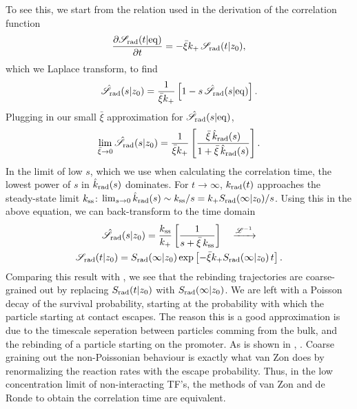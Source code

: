 To see this, we start from the relation used in the derivation of the correlation function 
\begin{equation}
 \frac{\partial \mathscr{S}_{\rm rad}(t|{\rm eq})}{\partial t} = -\bar{\xi} k_+ \, \mathscr{S}_{\rm rad}(t|z_0),
\end{equation}
which we Laplace transform, to find
\begin{equation}
 \hat{\mathscr{S}}_{\rm rad}(s|z_0) = \frac{1}{\bar{\xi}k_+} \left[ 1 - s\,\hat{\mathscr{S}}_{\rm rad}(s|{\rm eq})\right].
\end{equation}
Plugging in our small $\bar{\xi}$ approximation for $\hat{\mathscr{S}}_{\rm rad}(s|{\rm eq})$, 
\begin{equation}
 \lim_{\bar{\xi}\to 0} \hat{\mathscr{S}}_{\rm rad}(s|z_0) = \frac{1}{\bar{\xi} k_+} \left[ \frac{\bar{\xi}\,\hat{k}_{\rm rad}(s)}{1 + \bar{\xi}\,\hat{k}_{\rm rad}(s)}\right].
\end{equation}
In the limit of low $s$, which we use when calculating the correlation time, the lowest power of $s$ in $\hat{k}_{\rm rad}(s)$ dominates. For $t\to\infty$, $k_{\rm rad}(t)$ approaches the steady-state limit $k_{\rm ss}$: $\lim_{s\to0} \hat{k}_{\rm rad}(s) \sim k_{\rm ss}/s = k_+ S_{\rm rad}(\infty|z_0)/s$. Using this in the above equation, we can back-transform to the time domain
\begin{multline}
 \hat{\mathscr{S}}_{\rm rad}(s|z_0) = \frac{k_{\rm ss}}{k_+} \left[ \frac{1}{s + \bar{\xi}\,k_{\rm ss}} \right] \quad \xrightarrow{\mathscr{L}^{-1}} \\ \mathscr{S}_{\rm rad}(t|z_0) = S_{\rm rad}(\infty|z_0)\,{\rm exp}\left[ -\bar{\xi} k_+ S_{\rm rad}(\infty|z_0)\,t \right].
\end{multline}
Comparing this result with , we see that the rebinding trajectories are coarse-grained out by replacing $S_{\rm rad}(t|z_0)$ with $S_{\rm rad}(\infty|z_0)$. We are left with a Poisson decay of the survival probability, starting at the probability with which the particle starting at contact escapes. The reason this is a good approximation is due to the timescale seperation between particles comming from the bulk, and the rebinding of a particle starting on the promoter. As is shown in , . Coarse graining out the non-Poissonian behaviour is exactly what van Zon does by renormalizing the reaction rates with the escape probability. Thus, in the low concentration limit of non-interacting TF's, the methods of van Zon and de Ronde to obtain the correlation time are equivalent.


